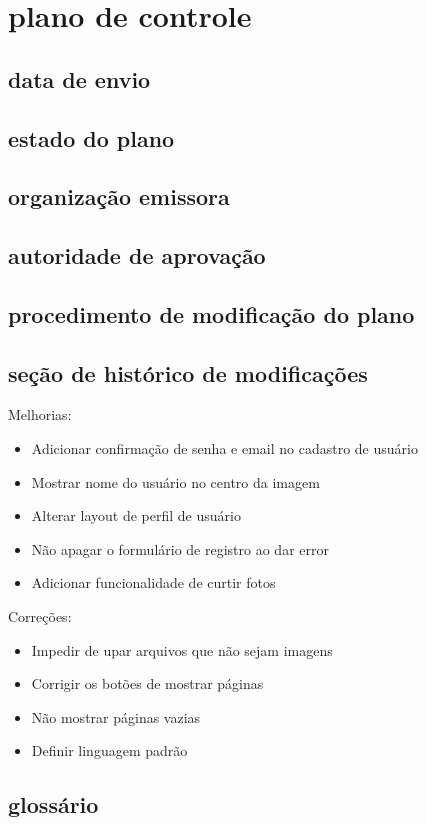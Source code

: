 \chapter{plano de controle}

\section{data de envio}

\section{estado do plano}

\section{organização emissora}

\section{autoridade de aprovação}

\section{procedimento de modificação do plano}

\section{seção de histórico de modificações}

Melhorias:

 \begin{itemize}
   \item Adicionar confirmação de senha e email no cadastro de usuário
   \item Mostrar nome do usuário no centro da imagem
   \item Alterar layout de perfil de usuário
   \item Não apagar o formulário de registro ao dar error
   \item Adicionar funcionalidade de curtir fotos
 \end{itemize}

Correções:

 \begin{itemize}
   \item Impedir de upar arquivos que não sejam imagens
   \item Corrigir os botões de mostrar páginas
   \item Não mostrar páginas vazias
   \item Definir linguagem padrão
 \end{itemize}

\section{glossário}
